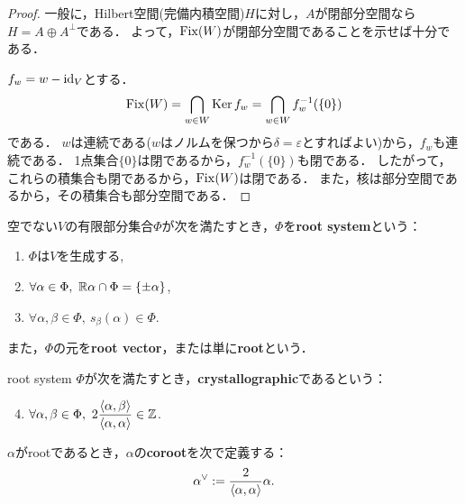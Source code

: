 \begin{proof}
  一般に，Hilbert空間(完備内積空間)$H$に対し，$A$が閉部分空間なら$H = A \oplus A^\perp$である．
  よって，$\operatorname{Fix}(W)$が閉部分空間であることを示せば十分である．

  $f_w = w - \operatorname{id}_V$とする．
  \begin{equation}
    \operatorname{Fix}(W) = \bigcap_{w \in W} \operatorname{Ker} f_w = \bigcap_{w \in W} f_w^{-1}(\{0\})
  \end{equation}
  である．
  $w$は連続である($w$はノルムを保つから$\delta = \varepsilon$とすればよい)から，$f_w$も連続である．
  1点集合$\{0\}$は閉であるから，$f_w^{-1}(\{0\})$も閉である．
  したがって，これらの積集合も閉であるから，$\operatorname{Fix}(W)$は閉である．
  また，核は部分空間であるから，その積集合も部分空間である．
\end{proof}

\begin{definition}
  空でない$V$の有限部分集合$\Phi$が次を満たすとき，$\Phi$を\textbf{root system}という：
  \begin{enumerate}[label=(\roman*)]
    \item $\Phi$は$V$を生成する, \label{defi:root_gen}
    \item $\forall \alpha \in \Phi,\ \mathbb{R} \alpha \cap \Phi = \{\pm \alpha\}$, \label{defi:root_self}
    \item $\forall \alpha, \beta \in \Phi,\ s_\beta(\alpha) \in \Phi$. \label{defi:root_ref_closed}
  \end{enumerate}
  また，$\Phi$の元を\textbf{root vector}，または単に\textbf{root}という．
\end{definition}

\begin{definition}
  root system $\Phi$が次を満たすとき，\textbf{crystallographic}であるという：
  \begin{enumerate}[label=(\roman*)]
    \setcounter{enumi}{3}
    \item $\forall \alpha, \beta \in \Phi,\ 2 \dfrac{\left\langle \alpha, \beta \right\rangle}{\left\langle \alpha, \alpha \right\rangle} \in \mathbb{Z}$.
  \end{enumerate}
\end{definition}

\begin{definition}
  $\alpha$がrootであるとき，$\alpha$の\textbf{coroot}を次で定義する：
  \begin{equation}
    \alpha^\vee := \frac{2}{\left\langle \alpha, \alpha \right\rangle} \alpha.
  \end{equation}
\end{definition}

